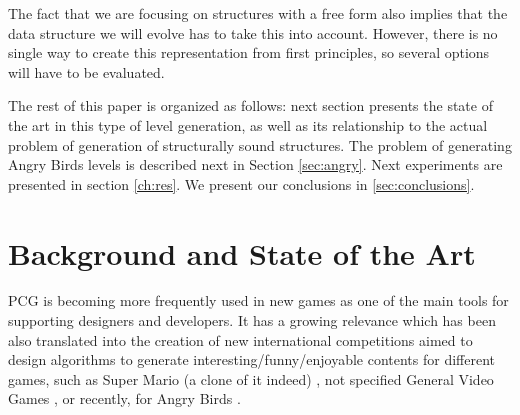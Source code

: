 \documentclass[runningheads,a4paper]{llncs}
\begin{document}
The fact that we are focusing on structures with a free form also
implies that the data structure we will evolve has to take this into
account. However, there is no single way to create this representation
from first principles, so several options will have to be evaluated. 



 

The rest of this paper is organized as follows: next section presents
the state of the art in this type of level generation, as well as its
relationship to the actual problem of generation of structurally sound
structures. The problem of generating Angry Birds levels is described
next in Section \ref{sec:angry}. Next experiments are presented in
section \ref{ch:res}. We present our conclusions in \ref{sec:conclusions}.

\section{Background and State of the Art}
\label{sec:soa}

PCG is becoming more frequently used in new games as one of the main
tools for supporting designers and developers. It has a growing
relevance which has been also translated into the creation of new
international competitions aimed to design algorithms to generate
interesting/funny/enjoyable contents for different games, such as
Super Mario (a clone of it indeed) \cite{MarioAI_Level_12}, not
specified General Video Games
\cite{GAIG_LevelGeneration_18,Khalifa_GVGLG_16}, or recently, for
Angry Birds \cite{AngryBirds_LevelGeneration_18}. 
\end{document}
